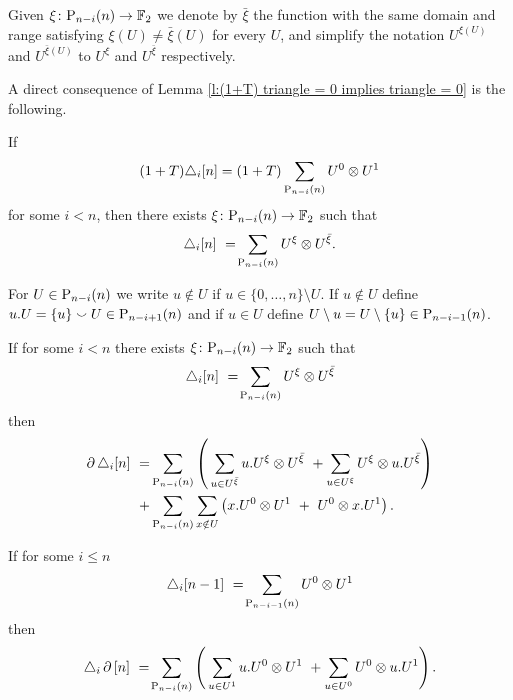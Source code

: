\subsection{}

\begin{notation}
	Given $\xi \colon \P_{n-i}(n) \to \F$ we denote by $\bar{\xi}$ the function with the same domain and range satisfying $\xi(U) \neq \bar{\xi}(U)$ for every $U$, and simplify the notation $U^{\xi(U)}$ and $U^{\bar{\xi}(U)}$ to $U^\xi$ and $U^{\bar{\xi}}$ respectively.
\end{notation}

A direct consequence of Lemma \ref{l:(1+T) triangle = 0 implies triangle = 0} is the following.

\begin{lemma}
    If
    \[
    (1+T) \triangle_i [n] =
    (1+T) \sum_{\P_{n-i}(n)} {U^0} \ot {U^1}
    \]
    for some $i < n$, then there exists $\xi \colon \P_{n-i}(n) \to \F$  such that
    \[
    \triangle_i  [n]\ =\! \sum_{\P_{n-i}(n)} {U^{\xi}} \ot {U^{\bar{\xi}}}.
    \]
\end{lemma}

\begin{notation}
    For $U \in \P_{n-i}(n)$ we write $u \notin U$ if $u \in \{0, \dots, n\} \setminus U$. If $u \notin U$ define $u.U = \{u\} \union U \in \P_{n-i+1}(n)$ and if $u \in U$ define $U \setminus u = U \setminus \{u\} \in \P_{n-i-1}(n)$.
\end{notation}

\begin{lemma} \label{l:boundary triangle}
	If for some $i < n$ there exists $\xi \colon \P_{n-i}(n) \to \F$ such that
	\[
	\triangle_i [n]\ =\! \sum_{\P_{n-i}(n)} {U^{\xi}} \ot {U^{{\bar{\xi}}}}
	\]
	then
	\begin{align*}
	\label{equation: boundary of triangle}
	\bd \triangle_i [n]\ = &
	\sum_{\P_{n-i}(n)} \left( \, \sum_{u \in U^{\bar{\xi}}} {u.U^\xi} \ot {U^{\bar{\xi}}} \ +
	\sum_{u \in U^\xi} {U^\xi} \ot {u.U^{\bar{\xi}}} \right) \\ + &
	\sum_{\P_{n-i}(n)} \sum_{x \notin U} \left( {x.U^0} \ot {U^1}\ +\ {U^0} \ot {x.U^1} \right).
	\end{align*}
\end{lemma}

\begin{lemma} \label{l:triangle boundary}
	If for some $i \leq n$
	\[
	\triangle_i [n-1]\ =\!
	\sum_{\P_{n-i-1}(n)} {U^0} \ot {U^1}
	\]
	then
	\begin{align}
	\label{equation: triangle of boundary}
	\triangle_i \bd \, [n] \ =\!
	\sum_{\P_{n-i}(n)} \left( \,
	\sum_{u \in U^1} {u.U^0} \ot {U^1} \ +
	\sum_{u \in U^0} {U^0} \ot {u.U^1} \right).
	\end{align}
\end{lemma}

